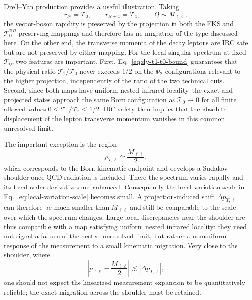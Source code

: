 \documentclass[11pt]{article}
\newcommand{\rn}{r_N}
\newcommand{\rnp}{r_{N+1}}
\newcommand{\Ph}{\Phi}
\begin{document}
Drell--Yan production provides a useful illustration. Taking
\begin{equation}
\rn=\mathcal T_0,
\qquad
\rnp=\mathcal T_1,
\qquad
Q\sim M_{\ell\ell},
\label{eq:dy-resolution-identification}
\end{equation}
the vector-boson rapidity is preserved by the projection in both the FKS and $\mathcal T_0^{\mathrm FR}$-preserving mappings and therefore has no migration of the type discussed
here. On the other end, the transverse momenta of the decay leptons are IRC safe but are not preserved by either mapping. For the local singular spectrum at fixed \(\mathcal T_0\), two features are important. First,
Eq.~\eqref{eq:dy-t1-t0-bound} guarantees that the physical ratio \(\mathcal T_1/\mathcal T_0\) never exceeds
\(1/2\) on the \(\Ph_2\) configurations relevant to the higher projection, independently of the ratio of the
two technical cuts. Second, since both maps have uniform nested infrared locality, the exact and projected states
approach the same Born configuration as \(\mathcal T_0\to0\) for all finite allowed values
\(0\le\mathcal T_1/\mathcal T_0\le1/2\). IRC safety then implies that the absolute displacement of the lepton
transverse momentum vanishes in this common unresolved limit.


The important exception is the region
\begin{equation}
p_{T,\ell}\simeq \frac{M_{\ell\ell}}{2},
\label{eq:dy-sudakov-shoulder}
\end{equation}
which corresponds to the Born kinematic endpoint and develops a Sudakov shoulder once QCD radiation is
included. There the spectrum varies rapidly and its fixed-order derivatives are enhanced. Consequently the
local variation scale in Eq.~\eqref{eq:local-variation-scale} becomes small. A projection-induced shift
\(\Delta p_{T,\ell}\) can therefore be much smaller than \(M_{\ell\ell}\) and still be comparable to the
scale over which the spectrum changes. Large local discrepancies near the shoulder are thus compatible with
a map satisfying uniform nested infrared locality: they need not signal a failure of the nested unresolved
limit, but rather a nonuniform response of the measurement to a small kinematic migration. Very close to the
shoulder, where
\begin{equation}
\left|p_{T,\ell}-\frac{M_{\ell\ell}}{2}\right|
\lesssim
|\Delta p_{T,\ell}|,
\label{eq:shoulder-migration-region}
\end{equation}
one should not expect the linearized measurement expansion to be quantitatively reliable; the exact
migration across the shoulder must be retained.
\end{document}
